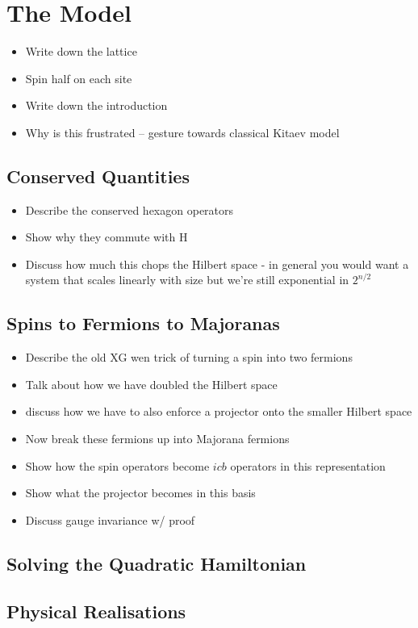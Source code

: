 
\section{The Model}
\begin{itemize}
    \item Write down the lattice
    \item Spin half on each site
    \item Write down the introduction
    \item Why is this frustrated -- gesture towards classical Kitaev model
\end{itemize}

\subsection{Conserved Quantities}
\begin{itemize}
    \item Describe the conserved hexagon operators
    \item Show why they commute with H
    \item Discuss how much this chops the Hilbert space - in general you would want a system that scales linearly with size but we're still exponential in $2^{n/2}$
\end{itemize}

\subsection{Spins to Fermions to Majoranas}
\begin{itemize}
    \item Describe the old XG wen trick of turning a spin into two fermions
    \item Talk about how we have doubled the Hilbert space
    \item discuss how we have to also enforce a projector onto the smaller Hilbert space
    \item Now break these fermions up into Majorana fermions
    \item Show how the spin operators become $icb$ operators in this representation
    \item Show what the projector becomes in this basis
    \item Discuss gauge invariance w/ proof
\end{itemize}

\subsection{Solving the Quadratic Hamiltonian}


\subsection{Physical Realisations}